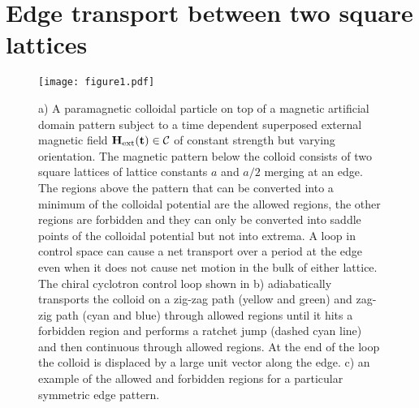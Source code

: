\documentclass[12pt]{iopart}
\begin{document}
\section{Edge transport between two square lattices}
\begin{figure}
		\texttt{[image: figure1.pdf]}
	\caption{a) A paramagnetic colloidal particle on top of a magnetic artificial domain pattern subject to a time dependent superposed external magnetic field $\bf H_{\textrm{ext}}(t)\in{\cal C}$ of constant strength but varying orientation.
   The magnetic pattern below the colloid  consists of two square lattices of lattice constants $a$ and $a/2$ merging at an edge. The regions above the pattern that can be converted into a minimum of the colloidal potential are the allowed regions, the other regions are forbidden and they can only be converted into saddle points of the colloidal potential but not into extrema. A loop in control space can cause a net transport over a period at the edge even when it does not cause net motion in the bulk of either lattice. The chiral cyclotron control loop shown in b) adiabatically transports the colloid on a zig-zag path (yellow and green)  and zag-zig path (cyan and blue) through allowed regions until it hits a forbidden region and performs a ratchet jump (dashed cyan line) and then continuous through allowed regions. At the end of the loop the colloid is displaced by a large unit vector along the edge. c) an example of the allowed and forbidden regions for a particular symmetric edge pattern.}
	\label{fig1}
\end{figure}
\end{document}
